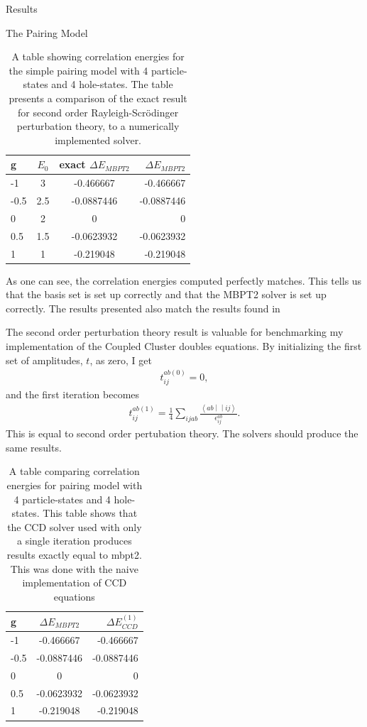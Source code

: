 \documentclass[twoside,english]{uiofysmaster}
\begin{document}
\begin{chapter}{Results}
\begin{section}{The Pairing Model}
		\begin{table}[H]
			\begin{center}
				\begin{tabular}[center]{l | c | c | r}
					g & $E_0$ & exact $ \Delta E_{MBPT2}$  & $\Delta E_{MBPT2}$ \\
					\hline
					-1 & 3 & -0.466667 & -0.466667 \\
					-0.5 & 2.5 & -0.0887446 & -0.0887446 \\
					0 & 2 & 0 & 0 \\
					0.5 & 1.5 & -0.0623932 & -0.0623932 \\
					1 & 1 & -0.219048 & -0.219048
				\end{tabular}
			\end{center}
			\caption{A table showing correlation energies for the simple pairing model with 4 particle-states and 4 hole-states. The table presents a comparison of the exact result for second order Rayleigh-Scr\"{o}dinger perturbation theory, to a numerically implemented solver. }
			\label{Results1}
		\end{table}
		As one can see, the correlation energies computed perfectly matches.  This tells us that the basis set is set up correctly and that the MBPT2 solver is set up correctly. The results presented also match the results found in \cite{Hjorth-Jensen2016}

		The second order perturbation theory result is valuable for benchmarking my implementation of the Coupled Cluster doubles equations. By initializing the first set of amplitudes, $t$, as zero, I get
		\begin{align}
			t_{ij}^{ab(0)} = 0 , 
		\end{align}
		and the first iteration becomes 
		\begin{align}
			t_{ij}^{ab(1)} = \frac{1}{4} \sum_{ijab} \frac{\left<ab\middle|\middle|ij\right>}{\epsilon_{ij}^{ab}} .
 		\end{align}
 		This is equal to second order pertubation theory. The solvers should produce the same results.
 		\begin{table}[H]
			\begin{center}
				\begin{tabular}[center]{l | c | r}
					g & $ \Delta E_{MBPT2}$  & $\Delta E_{CCD}^{(1)}$ \\
					\hline
					-1 & -0.466667 & -0.466667 \\
					-0.5 & -0.0887446 & -0.0887446 \\
					0 & 0 & 0 \\
					0.5 & -0.0623932 & -0.0623932 \\
					1 & -0.219048 & -0.219048
				\end{tabular}
			\end{center}
			\caption{A table comparing correlation energies for pairing model with 4 particle-states and 4 hole-states. This table shows that the CCD solver used with only a single iteration produces results exactly equal to mbpt2. This was done with the naive implementation of CCD equations}
			\label{Results2}
		\end{table}
		


\end{section}
\end{chapter}
\end{document}
